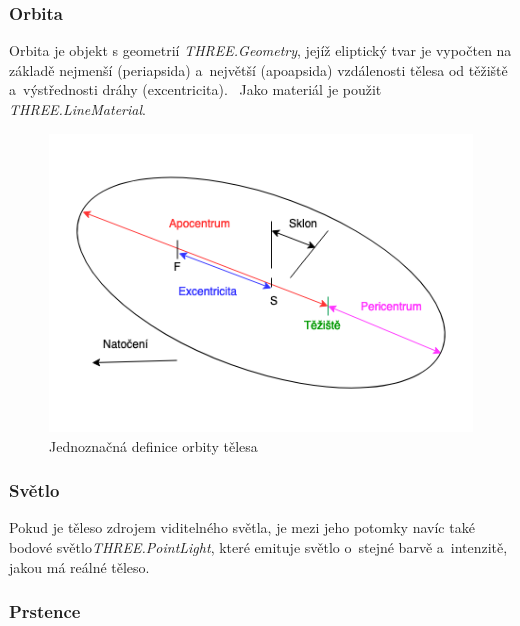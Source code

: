 \documentclass[a4paper,12pt]{article}
\begin{document}

\subsubsection{Orbita}

Orbita je objekt s geometrií \textit{THREE.Geometry}, jejíž eliptický tvar je vypočten na základě nejmenší (periapsida) a~největší (apoapsida) vzdálenosti tělesa od těžiště  a~výstřednosti dráhy (excentricita).~\cite{kleczek} Jako materiál je použit \textit{THREE.LineMaterial}.




\begin{figure}[H]
\begin{center}
\includegraphics[width=320pt]{Images/OrbitData.png}
\caption[Jednoznačná definice orbity tělesa]{Jednoznačná definice orbity tělesa \footnotemark[1]}
\end{center}
\end{figure}

\vspace*{-1cm}
\subsubsection{Světlo}

Pokud je těleso zdrojem viditelného světla, je mezi jeho potomky navíc také bodové světlo\newline \textit{THREE.PointLight}, které emituje světlo o~stejné barvě a~intenzitě, jakou má reálné těleso.

\subsubsection{Prstence}
\end{document}
